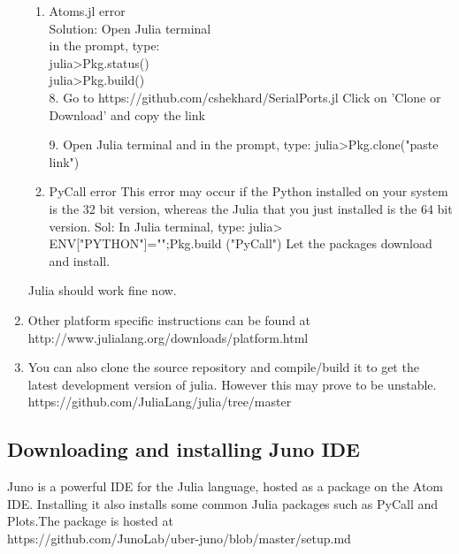 \begin{enumerate}
\begin{enumerate}
      \item Atoms.jl error\\
            Solution: Open Julia terminal\\
            in the prompt, type:\\
            julia>Pkg.status()\\
            julia>Pkg.build()\\
            8. Go to https://github.com/cshekhard/SerialPorts.jl
            Click on 'Clone or Download' and copy the link
            
            9. Open Julia terminal and in the prompt, type:
            julia>Pkg.clone("paste link")
            
      \item PyCall error
            This error may occur if the Python installed on your system is the 32 bit version, whereas the Julia that you just installed is the 64 bit version.
            Sol: In Julia terminal, type:
            julia> ENV["PYTHON"]="";Pkg.build ("PyCall")
            Let the packages download and install.
\end{enumerate}

Julia should work fine now.


\item Other platform specific instructions can be found at \\ 
http://www.julialang.org/downloads/platform.html 

\item You can also clone the source repository and compile/build it to get the  
latest development version of julia. However this may prove to be unstable.
https://github.com/JuliaLang/julia/tree/master 

\end {enumerate}

\subsection{Downloading and installing Juno IDE}\label{juno-ide-installation}

Juno is a powerful IDE for the Julia language, hosted as a package on the Atom IDE. Installing it also installs some common Julia packages such as PyCall and Plots.The package is hosted at \\
https://github.com/JunoLab/uber-juno/blob/master/setup.md 

